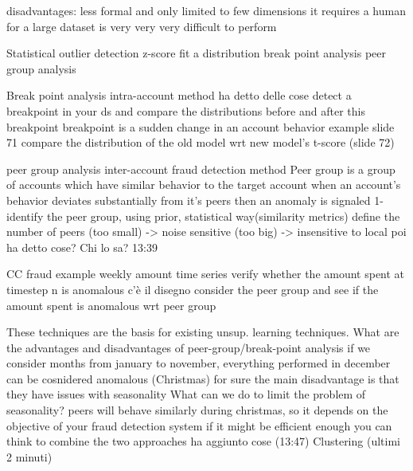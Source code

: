         disadvantages:
            less formal and only limited to few dimensions 
            it requires a human 
            for a large dataset is very very very difficult to perform 

    Statistical outlier detection 
        z-score 
        fit a distribution 
        break point analysis 
        peer group analysis

        Break point analysis
            intra-account method 
                ha detto delle cose 
                detect a breakpoint in your ds and compare the distributions before and after this breakpoint 
                breakpoint is a sudden change in an account behavior 
                example slide 71
                    compare the distribution of the old model wrt new model's 
                    t-score (slide 72)
        
        peer group analysis 
            inter-account fraud detection method 
            Peer group is a group of accounts which have similar behavior to the target account 
            when an account's behavior deviates substantially from it's peers then an anomaly is signaled 
                1- identify the peer group, using prior, statistical way(similarity metrics)
                    define the number of peers (too small) -> noise sensitive 
                                                (too big) -> insensitive to local
                poi ha detto cose? Chi lo sa? 13:39 

            CC fraud example 
                weekly amount time series 
                    verify whether the amount spent at timestep n is anomalous 
                    c'è il disegno 
                    consider the peer group and see if the amount spent is anomalous wrt peer group 

        These techniques are the basis for existing unsup. learning techniques.
            What are the advantages and disadvantages of peer-group/break-point analysis 
                if we consider months from january to november, everything performed in december can be cosnidered anomalous (Christmas)
                for sure the main disadvantage is that they have issues with seasonality
                What can we do to limit the problem of seasonality?
                    peers will behave similarly during christmas, so it depends on the objective of your fraud detection system
                    if it might be efficient enough you can think to combine the two approaches 
                    ha aggiunto cose (13:47)
    Clustering (ultimi 2 minuti)
